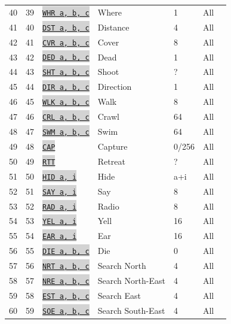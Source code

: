 \documentclass{article}
\newcommand{\vnscode}[1]{\colorbox{lightgray}{\lstinline[language=vns]{#1}}}
\begin{document}
\begin{longtable}{lllllll}
    40 & 39 & \hyperref[table:query]{\vnscode{WHR a, b, c}} & Where & 1 & All \\
    41 & 40 & \hyperref[table:query]{\vnscode{DST a, b, c}} & Distance & 4 & All \\
    42 & 41 & \hyperref[table:query]{\vnscode{CVR a, b, c}} & Cover & 8 & All \\
    43 & 42 & \hyperref[table:combat]{\vnscode{DED a, b, c}} & Dead & 1 & All \\
    44 & 43 & \hyperref[table:combat]{\vnscode{SHT a, b, c}} & Shoot & ? & All \\
    45 & 44 & \hyperref[table:query]{\vnscode{DIR a, b, c}} & Direction & 1 & All \\
    46 & 45 & \hyperref[table:movement]{\vnscode{WLK a, b, c}} & Walk & 8 & All \\
    47 & 46 & \hyperref[table:movement]{\vnscode{CRL a, b, c}} & Crawl & 64 & All \\
    48 & 47 & \hyperref[table:movement]{\vnscode{SWM a, b, c}} & Swim & 64 & All \\
    49 & 48 & \hyperref[table:combat]{\vnscode{CAP}} & Capture & 0/256 & All \\
    50 & 49 & \hyperref[table:movement]{\vnscode{RTT}} & Retreat & ? & All \\
    51 & 50 & \hyperref[table:combat]{\vnscode{HID a, i}} & Hide & a+i & All \\
    52 & 51 & \hyperref[table:communication]{\vnscode{SAY a, i}} & Say & 8 & All \\
    53 & 52 & \hyperref[table:communication]{\vnscode{RAD a, i}} & Radio & 8 & All \\
    54 & 53 & \hyperref[table:communication]{\vnscode{YEL a, i}} & Yell & 16 & All \\
    55 & 54 & \hyperref[table:communication]{\vnscode{EAR a, i}} & Ear & 16 & All \\
    56 & 55 & \hyperref[table:combat]{\vnscode{DIE a, b, c}} & Die & 0 & All \\
    57 & 56 & \hyperref[table:search]{\vnscode{NRT a, b, c}} & Search North & 4 & All \\
    58 & 57 & \hyperref[table:search]{\vnscode{NRE a, b, c}} & Search North-East & 4 & All \\
    59 & 58 & \hyperref[table:search]{\vnscode{EST a, b, c}} & Search East & 4 & All \\
    60 & 59 & \hyperref[table:search]{\vnscode{SOE a, b, c}} & Search South-East & 4 & All \\

\end{longtable}
\end{document}
